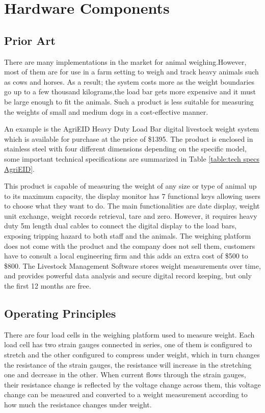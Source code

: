 
\chapter{Hardware Components}

\section{Prior Art}
There are many implementations in the market for animal weighing.However, most of them are for use in a farm setting to weigh and track heavy animals such as cows and horses. As a result; the system costs more as the weight boundaries go up to a few thousand kilograms,the load bar gets more expensive and it must be large enough to fit the animals.  Such a product is less suitable for measuring the weights of small and medium dogs in a cost-effective manner.

An example is the AgriEID Heavy Duty Load Bar digital livestock weight system which is available for purchase at the price of \$1395. The product is enclosed in stainless steel with four different dimensions depending on the specific model, some important technical specifications are summarized in Table \ref{table:tech specs AgriEID}.

This product is capable of measuring the weight of any size or type of animal up to its maximum capacity, the display monitor has 7 functional keys allowing users to choose what they want to do. The main functionalities are date display, weight unit exchange, weight records retrieval, tare and zero. However, it requires heavy duty 5m length dual cables to connect the digital display to the load bars, exposing tripping hazard to both staff and the animals. The weighing platform does not come with the product and the company does not sell them, customers have to consult a local engineering firm and this adds an extra cost of \$500 to \$800. The Livestock Management Software stores weight measurements over time, and provides powerful data analysis and secure digital record keeping, but only the first 12 months are free.

\section{Operating Principles}
There are four load cells in the weighing platform used to measure weight. Each load cell has two strain gauges connected in series, one of them is configured to stretch and the other configured to compress under weight, which in turn changes the resistance of the strain gauges, the resistance will increase in the stretching one and decrease in the other. When current flows through the strain gauges, their resistance change is reflected by the voltage change across them, this voltage change can be measured and converted to a weight measurement according to how much the resistance changes under weight.


